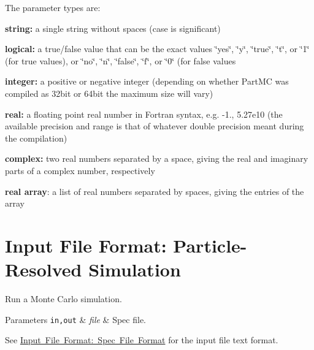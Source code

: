 The parameter types are\+:
\begin{DoxyItemize}
\item {\bfseries string\+:} a single string without spaces (case is significant)
\item {\bfseries logical\+:} a true/false value that can be the exact values \char`\"{}yes\char`\"{}, \char`\"{}y\char`\"{}, \char`\"{}true\char`\"{}, \char`\"{}t\char`\"{}, or \char`\"{}1\char`\"{} (for true values), or \char`\"{}no\char`\"{}, \char`\"{}n\char`\"{}, \char`\"{}false\char`\"{}, \char`\"{}f\char`\"{}, or \char`\"{}0\char`\"{} (for false values
\item {\bfseries integer\+:} a positive or negative integer (depending on whether Part\+MC was compiled as 32bit or 64bit the maximum size will vary)
\item {\bfseries real\+:} a floating point real number in Fortran syntax, e.\+g. -\/1., 5.\+27e10 (the available precision and range is that of whatever double precision meant during the compilation)
\item {\bfseries complex\+:} two real numbers separated by a space, giving the real and imaginary parts of a complex number, respectively
\item {\bfseries real array}\+: a list of real numbers separated by spaces, giving the entries of the array 
\end{DoxyItemize}\hypertarget{input_format_particle}{}\section{Input File Format\+: Particle-\/\+Resolved Simulation}\label{input_format_particle}
Run a Monte Carlo simulation.


\begin{DoxyParams}[1]{Parameters}
\mbox{\tt in,out}  & {\em file} & Spec file.\\
\hline
\end{DoxyParams}
See \mbox{\hyperlink{spec_file_format}{Input File Format\+: Spec File Format}} for the input file text format.

